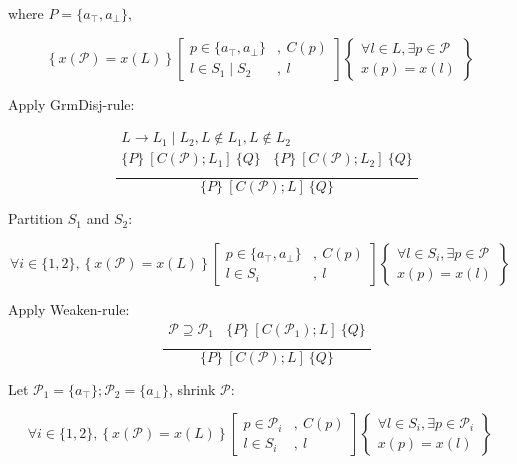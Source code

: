 \documentclass[12pt]{article}
\begin{document}
where $P = \{a_\top, a_{\bot} \}$,

\[
\left\{ x(\mathcal{P})=x(L) \right\}
\left[
\begin{array}{ll}
p \in \{a_\top, a_{\bot}\} & , ~C(p) \\
l \in S_1 \mid S_2 & , ~l
\end{array}
\right]
\left\{
\begin{array}{c}
\forall l \in L, \exists p \in \mathcal{P} \\
x(p) = x(l)
\end{array}
\right\}
\]

Apply GrmDisj-rule:


\[
\quad
\frac{
\begin{array}{c}
L \rightarrow L_1 \mid L_2, L \notin L_1, L \notin L_2 \\
\{ P \} \ [C(\mathcal{P}) ; L_1] \ \{ Q\} ~~~~
\{ P \} \ [C(\mathcal{P}) ; L_2] \ \{ Q\} \\
\end{array}
}{
\{ P \} \ [ C(\mathcal{P}); L] \ \{ Q \}
}
\]


Partition $S_1$ and $S_2$:

\[
\forall i \in \{1, 2\}, 
\left\{ x(\mathcal{P})=x(L) \right\}
\left[
\begin{array}{ll}
p \in \{a_\top, a_\bot\} & , ~C(p) \\
l \in S_i & , ~l
\end{array}
\right]
\left\{
\begin{array}{c}
\forall l \in S_i, \exists p \in \mathcal{P} \\
x(p) = x(l)
\end{array}
\right\}
\]

Apply Weaken-rule:
\[
\quad
\frac{
\begin{array}{c}
 \mathcal{P} \supseteq \mathcal{P}_1 ~~~~
\{ P \} \ [C(\mathcal{P}_1) ; L] \ \{ Q\} \\
\end{array}
}{
\{ P \} \ [ C(\mathcal{P}); L] \ \{ Q \}
}
\]

Let $\mathcal{P}_1 = \{a_\top\}; \mathcal{P}_2 = \{a_\bot\}$, shrink $\mathcal{P}$:

\[
\forall i \in \{1, 2\}, 
\left\{ x(\mathcal{P})=x(L) \right\}
\left[
\begin{array}{ll}
p \in  \mathcal{P}_i& , ~C(p) \\
l \in S_i & , ~l
\end{array}
\right]
\left\{
\begin{array}{c}
\forall l \in S_i, \exists p \in \mathcal{P}_i \\
x(p) = x(l)
\end{array}
\right\}
\]
\end{document}
